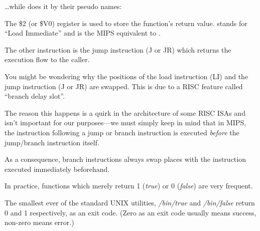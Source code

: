 \dots while \IDA does it by their pseudo names:



The \$2 (or \$V0) register is used to store the function's return value.
 stands for ``Load Immediate'' and is the MIPS equivalent to \MOV.

The other instruction is the jump instruction (J or JR) which returns the execution flow to the \gls{caller}.

You might be wondering why the positions of the load instruction (LI) and the jump instruction (J or JR) are swapped. This is due to a \ac{RISC} feature called ``branch delay slot''.

The reason this happens is a quirk in the architecture of some RISC \ac{ISA}s and isn't important for our
purposes---we must simply keep in mind that in MIPS, the instruction following a jump or branch instruction
is executed \emph{before} the jump/branch instruction itself.

As a consequence, branch instructions always swap places with the instruction executed immediately beforehand.

In practice, functions which merely return 1 (\emph{true}) or 0 (\emph{false}) are very frequent.

The smallest ever of the standard UNIX utilities, \emph{/bin/true} and \emph{/bin/false} return 0 and 1 respectively, as an exit code.
(Zero as an exit code usually means success, non-zero means error.)
